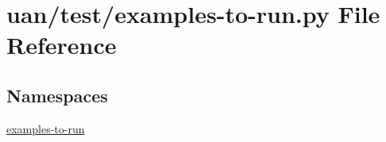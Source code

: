 \hypertarget{uan_2test_2examples-to-run_8py}{}\section{uan/test/examples-\/to-\/run.py File Reference}
\label{uan_2test_2examples-to-run_8py}
\subsection*{Namespaces}
\begin{DoxyCompactItemize}
\item 
 \hyperlink{namespaceexamples-to-run}{examples-\/to-\/run}
\end{DoxyCompactItemize}
